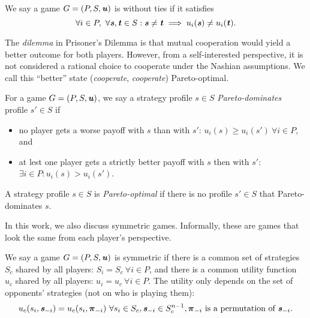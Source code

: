 \begin{definition}
  We say a game $G = (P, S, \boldsymbol{\mathit{u}})$ is without ties if it satisfies
  \[
    \forall i \in P,\ \forall \boldsymbol{\mathit{s}}, \boldsymbol{\mathit{t}} \in S: \boldsymbol{\mathit{s}} \ne \boldsymbol{\mathit{t}} \implies u_i(\boldsymbol{\mathit{s}}) \ne u_i(\boldsymbol{\mathit{t}}).
  \]
\end{definition}

The \textit{dilemma} in Prisoner's Dilemma is that mutual cooperation would yield a better outcome for both players.
However, from a self-interested perspective, it is not considered a rational choice to cooperate under the Nashian assumptions.
We call this \enquote{better} state (\textit{cooperate}, \textit{cooperate}) Pareto-optimal.

\begin{definition}
  For a game $G = (P, S, \boldsymbol{\mathit{u}})$, we say a strategy profile $s \in S$ \textit{Pareto-dominates} profile $s' \in S$ if
  \begin{itemize}
    \item no player gets a worse payoff with $s$ than with $s'$: $u_i(s) \ge u_i(s')\ \forall i \in P$, and
    \item at lest one player gets a strictly better payoff with $s$ then with $s'$: $\exists i \in P: u_i(s) > u_i(s')$.
  \end{itemize}
  A strategy profile $s \in S$ is \textit{Pareto-optimal} if there is no profile $s' \in S$ that Pareto-dominates $s$.
\end{definition}

In this work, we also discuss symmetric games.
Informally, these are games that look the same from each player's perspective.

\begin{definition}
	We say a game $G = (P, S, \boldsymbol{\mathit{u}})$ is symmetric if there is a common set of strategies $S_c$ shared by all players:
  $S_i = S_c\ \forall i \in P$,
  and there is a common utility function $u_c$ shared by all players:
  $u_i = u_c\ \forall i \in P$.
  The utility only depends on the set of opponents' strategies (not on who is playing them):
  \[
    u_c(s_i, \boldsymbol{\mathit{s}}_{-i}) = u_c(s_i, \boldsymbol{\pi}_{-i})\ \forall s_i \in S_c, \boldsymbol{\mathit{s}}_{-i} \in S_c^{n-1}, \boldsymbol{\pi}_{-i} \text{ is a permutation of } \boldsymbol{\mathit{s}}_{-i}.
  \]
\end{definition}


